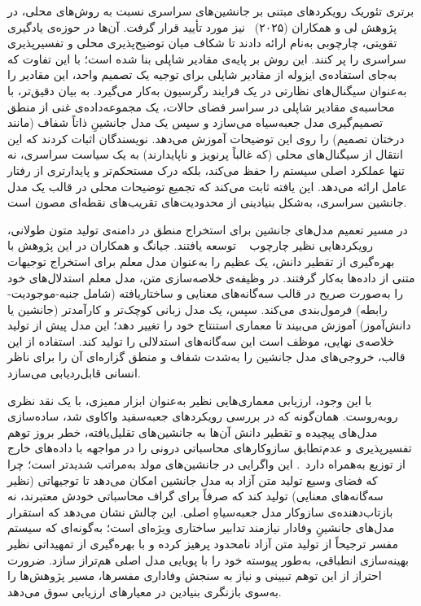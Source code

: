 \normalfootnotes{}
برتری تئوریک رویکردهای مبتنی بر جانشین‌های سراسری نسبت به روش‌های محلی، در پژوهش لی و همکاران (۲۰۲۵)~\cite{li2025fromexplainability} نیز مورد تأیید قرار گرفت. آن‌ها در حوزه‌ی یادگیری تقویتی، چارچوبی به‌نام  ارائه دادند تا شکاف میان توضیح‌پذیری محلی و تفسیرپذیری سراسری را پر کنند. این روش بر پایه‌ی مقادیر شاپلی بنا شده است؛ با این تفاوت که به‌جای استفاده‌ی ایزوله از مقادیر شاپلی برای توجیه یک تصمیم واحد، این مقادیر را به‌عنوان سیگنال‌های نظارتی در یک فرایند رگرسیون به‌کار می‌گیرد. به بیان دقیق‌تر،  با محاسبه‌ی مقادیر شاپلی در سراسر فضای حالات، یک مجموعه‌داده‌ی غنی از منطق تصمیم‌گیری مدل جعبه‌سیاه می‌سازد و سپس یک مدل جانشینِ ذاتاً شفاف (مانند درختان تصمیم) را روی این توضیحات آموزش می‌دهد. نویسندگان اثبات کردند که این انتقال از سیگنال‌های محلی (که غالباً پرنویز و ناپایدارند) به یک سیاست سراسری، نه تنها عملکرد اصلی سیستم را حفظ می‌کند، بلکه درک مستحکم‌تر و پایدارتری از رفتار عامل ارائه می‌دهد. این یافته ثابت می‌کند که تجمیع توضیحات محلی در قالب یک مدل جانشین سراسری، به‌شکل بنیادینی از محدودیت‌های تقریب‌های نقطه‌ای مصون است.
\twocolumnfootnotes{}

در مسیر تعمیم مدل‌های جانشین برای استخراج منطق در دامنه‌ی تولید متون طولانی، رویکردهایی نظیر چارچوب ~\cite{jiang2024trisum} توسعه یافتند. جیانگ و همکاران در این پژوهش با بهره‌گیری از تقطیر دانش، یک  عظیم را به‌عنوان مدل معلم برای استخراج توجیهات متنی از داده‌ها به‌کار گرفتند. در وظیفه‌ی خلاصه‌سازی متن، مدل معلم استدلال‌های خود را به‌صورت صریح در قالب سه‌گانه‌های معنایی و ساختاریافته (شامل جنبه-موجودیت-رابطه) فرمول‌بندی می‌کند. سپس، یک مدل زبانی کوچک‌تر و کارآمدتر (جانشین یا دانش‌آموز) آموزش می‌بیند تا معماری استنتاج خود را تغییر دهد؛ این مدل پیش از تولید خلاصه‌ی نهایی، موظف است این سه‌گانه‌های استدلالی را تولید کند. استفاده از این قالب، خروجی‌های مدل جانشین را به‌شدت شفاف و منطق گزاره‌ای آن را برای ناظر انسانی قابل‌ردیابی می‌سازد.

با این وجود، ارزیابی معماری‌هایی نظیر  به‌عنوان ابزار ممیزی، با یک نقد نظری روبه‌روست. همان‌گونه که در بررسی رویکردهای جعبه‌سفید واکاوی شد، ساده‌سازی مدل‌های پیچیده و تقطیر دانش آن‌ها به جانشین‌های تقلیل‌یافته، خطر بروز توهم تفسیرپذیری و عدم‌تطابق سازوکارهای محاسباتی درونی را در مواجهه با داده‌های خارج از توزیع به‌همراه دارد~\cite{friedman2024interpretability}. این واگرایی در جانشین‌های مولد به‌مراتب شدیدتر است؛ چرا که فضای وسیع تولید متن آزاد به مدل جانشین امکان می‌دهد تا توجیهاتی (نظیر سه‌گانه‌های معنایی) تولید کند که صرفاً برای گراف محاسباتی خودش معتبرند، نه بازتاب‌دهنده‌ی سازوکار مدل جعبه‌سیاهِ اصلی. این چالش نشان می‌دهد که استقرار مدل‌های جانشینِ وفادار نیازمند تدابیر ساختاری ویژه‌ای است؛ به‌گونه‌ای که سیستم مفسر ترجیحاً از تولید متن آزاد نامحدود پرهیز کرده و با بهره‌گیری از تمهیداتی نظیر بهینه‌سازی انطباقی، به‌طور پیوسته خود را با پویایی مدل اصلی هم‌تراز سازد. ضرورت احتراز از این توهم تبیینی و نیاز به سنجش وفاداری مفسرها، مسیر پژوهش‌ها را به‌سوی بازنگری بنیادین در معیارهای ارزیابی سوق می‌دهد.


